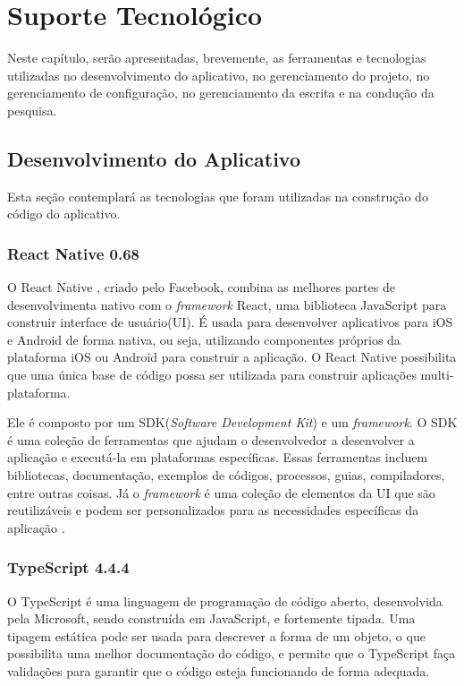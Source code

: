 \chapter[Suporte Tecnológico]{Suporte Tecnológico}
\label{ch:suporte}

Neste capítulo, serão apresentadas, brevemente, as ferramentas e tecnologias 
utilizadas no desenvolvimento do aplicativo, no gerenciamento 
do projeto, no gerenciamento de configuração, no gerenciamento da 
escrita e na condução da pesquisa.


\section{Desenvolvimento do Aplicativo}

Esta seção contemplará as tecnologias que foram utilizadas na construção do 
código do aplicativo.

\subsection{React Native 0.68}

O React Native \cite{reactNative}, criado pelo Facebook, combina as melhores partes de 
desenvolvimenta nativo com 
o \emph{framework} React, uma biblioteca JavaScript para construir interface de usuário(UI). 
É usada para desenvolver aplicativos para iOS e Android de forma nativa, ou seja, utilizando 
componentes próprios da plataforma iOS ou Android para construir a aplicação. O React Native 
possibilita que uma única base de código possa ser utilizada para construir aplicações 
multi-plataforma.

Ele é composto por um SDK(\emph{Software Development Kit}) e um
\emph{framework}. O SDK é uma coleção de ferramentas que ajudam
o desenvolvedor a desenvolver a aplicação e executá-la em
plataformas específicas. Essas ferramentas incluem bibliotecas,
documentação, exemplos de códigos, processos, guias,
compiladores, entre outras coisas. Já o \emph{framework} é
uma coleção de elementos da UI que são reutilizáveis e podem
ser personalizados para as necessidades específicas da
aplicação \cite{reactNative}.

\subsection{TypeScript 4.4.4}

O TypeScript \cite{typescript} é uma linguagem de programação de código aberto, desenvolvida 
pela Microsoft, sendo construída em JavaScript, e fortemente tipada. Uma tipagem estática pode 
ser usada para descrever a forma de um objeto, o que possibilita uma melhor documentação do 
código, e permite que o TypeScript faça validações para garantir que o código esteja funcionando 
de forma adequada.


